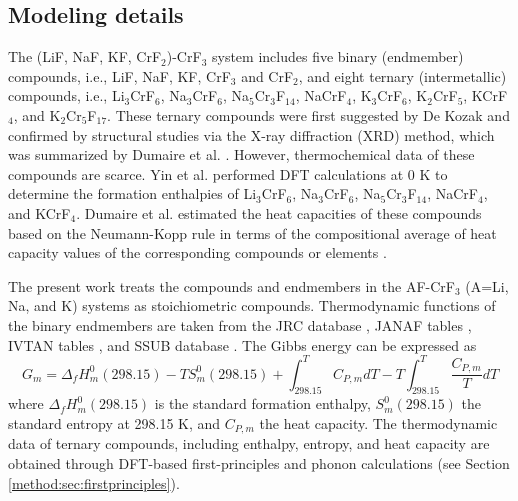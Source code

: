 \subsection{Modeling details} \label{moltensalts:ssec:FLiNaKCrmodel}
The (LiF, NaF, KF, CrF$_2$)-CrF$_3$ system includes five binary (endmember) compounds, i.e., LiF, NaF, KF, CrF$_3$ and CrF$_2$, and eight ternary (intermetallic) compounds, i.e., Li$_3$CrF$_6$, Na$_3$CrF$_6$, Na$_5$Cr$_3$F$_{14}$, NaCrF$_4$, K$_3$CrF$_6$, K$_2$CrF$_5$, KCrF$_4$, and K$_2$Cr$_5$F$_{17}$. These ternary compounds were first suggested by De Kozak \cite{DeKozak1969} and confirmed by structural studies \cite{de1975systeme,miranday1975croissance, sturm1962phase, garcia2014electrostatic, brunton1969crystal, le2003distorted, manaka2011effects, sassoye2006crystal} via the X-ray diffraction (XRD) method, which was summarized by Dumaire et al. \cite{dumaire2021thermodynamic}. However, thermochemical data of these compounds are scarce. Yin et al. \cite{yin2018thermodynamic, yin2015thermodynamic, yin2014thermodynamic} performed DFT calculations at 0 K to determine the formation enthalpies of Li$_3$CrF$_6$, Na$_3$CrF$_6$, Na$_5$Cr$_3$F$_{14}$, NaCrF$_4$, and KCrF$_4$. Dumaire et al. \cite{dumaire2021thermodynamic} estimated the heat capacities of these compounds based on the Neumann-Kopp rule in terms of the compositional average of heat capacity values of the corresponding compounds or elements \cite{leitner2010application}. 

The present work treats the compounds and endmembers in the AF-CrF${_3}$ (A=Li, Na, and K) systems as stoichiometric compounds. Thermodynamic functions of the binary endmembers are taken from the JRC database \cite{konings2020comprehensive}, JANAF tables \cite{chase1982janaf}, IVTAN tables \cite{gurvich1993ivtanthermo}, and SSUB database \cite{sgteurl}. The Gibbs energy can be expressed as 
\begin{equation} \label{ms:eq:Gstoi}
    G_m=\Delta_f H_m^0 (298.15)-T S_m^0 (298.15)+\int_{298.15}^T C_{P,m} dT - T\int_{298.15}^T \dfrac{C_{P,m}}{T} dT
\end{equation}
where $\Delta_f H_m^0 (298.15)$ is the standard formation enthalpy, $S_m^0 (298.15)$ the standard entropy at 298.15 K, and $C_{P,m}$ the heat capacity. The thermodynamic data of ternary compounds, including enthalpy, entropy, and heat capacity are obtained through DFT-based first-principles and phonon calculations (see Section \ref{method:sec:firstprinciples}).

